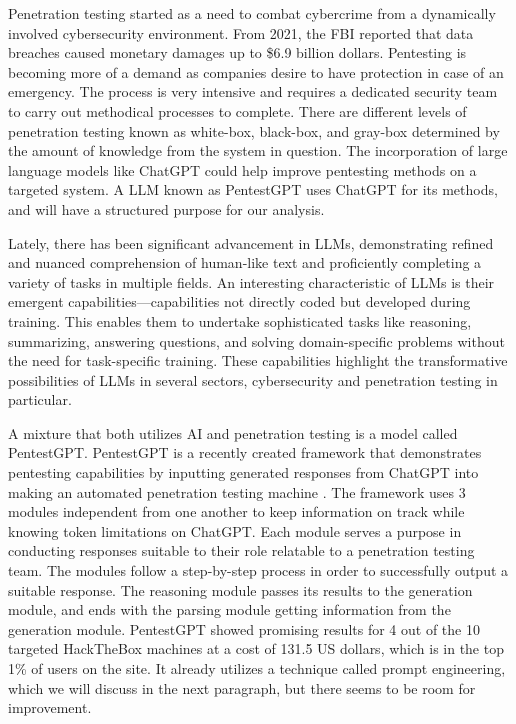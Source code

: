 \documentclass[conference]{IEEEtran}
\begin{document}
Penetration testing started as a need to combat cybercrime from a dynamically involved cybersecurity environment\cite{deng2023pentestgpt}. From 2021, the FBI reported that data breaches caused monetary damages up to \$6.9 billion dollars\cite{heim2023convergence}.  Pentesting is becoming more of a demand as companies desire to have protection in case of an emergency. The process is very intensive and requires a dedicated security team to carry out methodical processes to complete\cite{applebaum2017analysis}. There are different levels of penetration testing known as white-box, black-box, and gray-box determined by the amount of knowledge from the system in question\cite{deng2023pentestgpt}. The incorporation of large language models like ChatGPT could help improve pentesting methods on a targeted system. A LLM known as PentestGPT uses ChatGPT for its methods, and will have a structured purpose for our analysis\cite{deng2023pentestgpt}.

Lately, there has been significant advancement in LLMs, demonstrating refined and nuanced comprehension of human-like text and proficiently completing a variety of tasks in multiple fields\cite{zhao2023survey}\cite{liu2023summary}. An interesting characteristic of LLMs is their emergent capabilities—capabilities not directly coded but developed during training\cite{wei2022emergent}. This enables them to undertake sophisticated tasks like reasoning, summarizing, answering questions, and solving domain-specific problems without the need for task-specific training. These capabilities highlight the transformative possibilities of LLMs in several sectors, cybersecurity and penetration testing in particular.

A mixture that both utilizes AI and penetration testing is a model called PentestGPT\cite{heim2023convergence}. PentestGPT is a recently created framework that demonstrates pentesting capabilities by inputting generated responses from ChatGPT into making an automated penetration testing machine \cite{deng2023pentestgpt}. The framework uses 3 modules independent from one another to keep information on track while knowing token limitations on ChatGPT. Each module serves a purpose in conducting responses suitable to their role relatable to a penetration testing team. The modules follow a step-by-step process in order to successfully output a suitable response. The reasoning module passes its results to the generation module, and ends with the parsing module getting information from the generation module. PentestGPT showed promising results for 4 out of the 10 targeted HackTheBox\cite{hackthebox} machines at a cost of 131.5 US dollars, which is in the top 1\% of users on the site. It already utilizes a technique called prompt engineering, which we will discuss in the next paragraph, but there seems to be room for improvement\cite{white2023prompt}.
\end{document}
